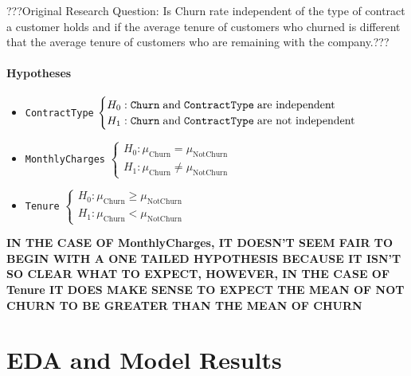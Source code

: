 \documentclass[man, floatsintext]{apa6}
\begin{document}
???Original Research Question:
Is Churn rate independent of the type of contract a customer holds and if the average tenure of customers who churned is different that the average tenure of customers who are remaining with the company.???

\paragraph{Hypotheses}

\begin{itemize}
\item \texttt{ContractType} $\begin{cases}
H_0: \texttt{Churn} \hspace{1mm} \text{and}  \hspace{1mm} \texttt{ContractType} \hspace{1mm} \text{are independent} \\
H_1: \texttt{Churn} \hspace{1mm} \text{and} \hspace{1mm} \texttt{ContractType} \hspace{1mm} \text{are not independent}
\end{cases}$
\item \texttt{MonthlyCharges} $\begin{cases}
H_0: \mu_{\text{Churn}} = \mu_{\text{NotChurn}} \\
H_1: \mu_{\text{Churn}} \neq \mu_{\text{NotChurn}}
\end{cases}$
\item \texttt{Tenure} $\begin{cases}
H_0: \mu_{\text{Churn}} \geq \mu_{\text{NotChurn}} \\
H_1: \mu_{\text{Churn}} < \mu_{\text{NotChurn}}
\end{cases}$
\end{itemize}

\textbf{IN THE CASE OF MonthlyCharges, IT DOESN'T SEEM FAIR TO BEGIN WITH A ONE TAILED HYPOTHESIS BECAUSE IT ISN'T SO CLEAR WHAT TO EXPECT, HOWEVER, IN THE CASE OF Tenure IT DOES MAKE SENSE TO EXPECT THE MEAN OF NOT CHURN TO BE GREATER THAN THE MEAN OF CHURN}



\section{EDA and Model Results}
\end{document}
